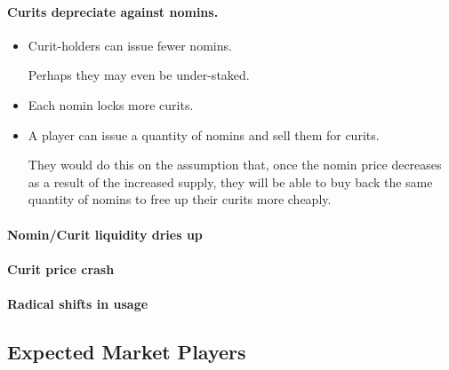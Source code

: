 \paragraph{Curits depreciate against nomins.}
\begin{itemize}
	\item{Curit-holders can issue fewer nomins.}
	
	Perhaps they may even be under-staked.

	\item{Each nomin locks more curits.}
	\item{A player can issue a quantity of nomins and sell them for curits.}
		  
	They would do this on the assumption that, once the nomin price decreases as a result of the increased
	supply, they will be able to buy back the same quantity of nomins to free up their
	curits more cheaply.
\end{itemize}

\paragraph{Nomin/Curit liquidity dries up}

\paragraph{Curit price crash}

\paragraph{Radical shifts in usage}

\subsection{Expected Market Players}

